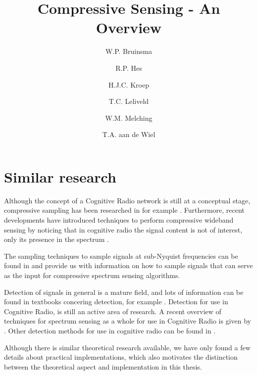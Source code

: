 \documentclass[a4paper, openany, oneside]{memoir}
\title{Compressive Sensing - An Overview}
\author{W.P. Bruinsma \and R.P. Hes \and H.J.C. Kroep \and T.C. Leliveld \and W.M. Melching \and T.A. aan de Wiel}
\begin{document}
\chapter{Similar research}

Although the concept of a Cognitive Radio network is still at a conceptual stage, compressive sampling has been researched in for example 
\cite{candes2007sparsity,candes2006robust,zhang2008theory,candes2008introduction}. Furthermore, recent developments have introduced techniques to perform compressive wideband sensing by noticing that in cognitive radio the signal content is not of interest, only its presence in the spectrum \cite{ariananda2012compressive,ariananda2014cooperative}. 

The sampling techniques to sample signals at sub-Nyquist frequencies can be found in \cite{pal2011coprime,ariananda2011multicoset,lexa2011multi} and provide us with information on how to sample signals that can serve as the input for compressive spectrum sensing algorithms.

Detection of signals in general is a mature field, and lots of information can be found in textbooks concering detection, for example \cite{couch2013digital,kay1998fundamentals}. Detection for use in Cognitive Radio, is still an active area of research. A recent overview of techniques for spectrum sensing as a whole for use in Cognitive Radio is given by \cite{axell2012spectrum}. Other detection methods for use in cognitive radio can be found in \cite{han2013novel,zheng2009spectrum}.

Although there is similar theoretical research available, we have only found a few details about practical implementations, which also motivates the distinction between the theoretical aspect and implementation in this thesis.   
\end{document}
